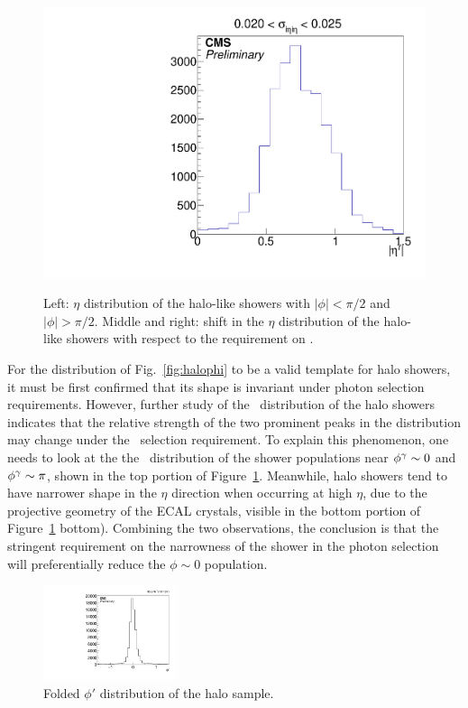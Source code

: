 \begin{figure}[htbp]
{    \includegraphics[]{Reconstruction/Figures/halo/halo_shape_etahigh.pdf}
  }
  \caption{
    Left: $\eta$ distribution of the halo-like showers with $|\phi| < \pi/2$ and $|\phi| > \pi/2$.
    Middle and right: shift in the $\eta$ distribution of the halo-like showers with respect to the requirement on \sieie.
  }
  \label{fig:halo_eta}
\end{figure}

For the distribution of Fig.~\ref{fig:halophi} to be a valid template for halo showers, it must be first confirmed that its shape is invariant under photon selection requirements. 
However, further study of the \phig\ distribution of the halo showers indicates that the relative strength of the two prominent peaks in the distribution may change under the \sieie\ selection requirement.  
To explain this phenomenon, one needs to look at the the \etag\ distribution of the shower populations near $\phi^{\gamma} \sim 0$ and $\phi^{\gamma} \sim \pi$, shown in the top portion of Figure~\ref{fig:halo_eta}. 
Meanwhile, halo showers tend to have narrower shape in the $\eta$ direction when occurring at high $\eta$, due to the projective geometry of the ECAL crystals, visible in the bottom portion of Figure~\ref{fig:halo_eta} bottom). 
Combining the two observations, the conclusion is that the stringent requirement on the narrowness of the shower in the photon selection will preferentially reduce the $\phi \sim 0$ population.

\begin{figure}[htbp]
  \centering
  \includegraphics[width=0.35\textwidth]{Reconstruction/Figures/halo/haloPhiFolded.pdf}
  \caption{
    Folded $\phi'$ distribution of the halo sample.
  }
  \label{fig:halo_template}
\end{figure}

